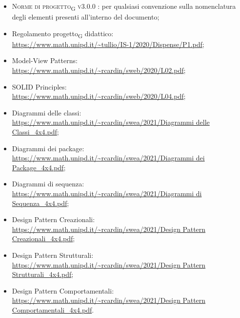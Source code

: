 \begin{itemize}
	\item \textsc{Norme di progetto\textsubscript{G} v3.0.0 }: per qualsiasi convenzione sulla nomenclatura degli elementi presenti all’interno del documento;
	
	\item Regolamento progetto\textsubscript{G} didattico: \\ {\url{https://www.math.unipd.it/~tullio/IS-1/2020/Dispense/P1.pdf}};
	\item Model-View Patterns: \\ {\url{https://www.math.unipd.it/~rcardin/sweb/2020/L02.pdf}};
	\item SOLID Principles: \\ {\url{https://www.math.unipd.it/~rcardin/sweb/2020/L04.pdf}};
	\item Diagrammi delle classi: \\ {\url{https://www.math.unipd.it/~rcardin/swea/2021/Diagrammi delle Classi_4x4.pdf}};
	\item Diagrammi dei package: \\ {\url{https://www.math.unipd.it/~rcardin/swea/2021/Diagrammi dei Package_4x4.pdf}};
	\item Diagrammi di sequenza: \\ {\url{https://www.math.unipd.it/~rcardin/swea/2021/Diagrammi di Sequenza_4x4.pdf}};
	\item Design Pattern Creazionali: \\ {\url{https://www.math.unipd.it/~rcardin/swea/2021/Design Pattern Creazionali_4x4.pdf}};
	\item Design Pattern Strutturali: \\ {\url{https://www.math.unipd.it/~rcardin/swea/2021/Design Pattern Strutturali_4x4.pdf}};
	\item Design Pattern Comportamentali: \\ {\url{https://www.math.unipd.it/~rcardin/swea/2021/Design Pattern Comportamentali_4x4.pdf}}.
\end{itemize}



